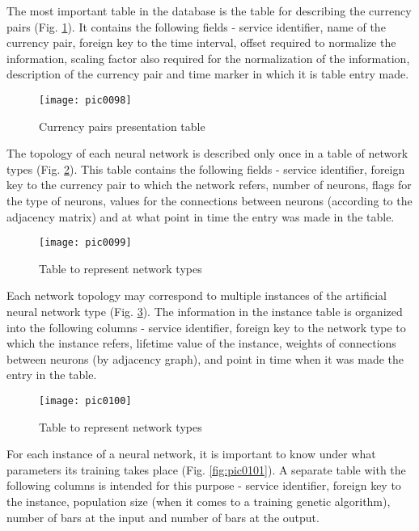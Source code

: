 The most important table in the database is the table for describing the currency pairs (Fig. \ref{fig:pic0098}). It contains the following fields - service identifier, name of the currency pair, foreign key to the time interval, offset required to normalize the information, scaling factor also required for the normalization of the information, description of the currency pair and time marker in which it is table entry made.

\begin{figure}[h]
\centering
\texttt{[image: pic0098]}
\caption{Currency pairs presentation table}
\label{fig:pic0098}
\end{figure}
\FloatBarrier

The topology of each neural network is described only once in a table of network types (Fig. \ref{fig:pic0099}). This table contains the following fields - service identifier, foreign key to the currency pair to which the network refers, number of neurons, flags for the type of neurons, values for the connections between neurons (according to the adjacency matrix) and at what point in time the entry was made in the table.

\begin{figure}[h]
\centering
\texttt{[image: pic0099]}
\caption{Table to represent network types}
\label{fig:pic0099}
\end{figure}
\FloatBarrier

Each network topology may correspond to multiple instances of the artificial neural network type (Fig. \ref{fig:pic0100}). The information in the instance table is organized into the following columns - service identifier, foreign key to the network type to which the instance refers, lifetime value of the instance, weights of connections between neurons (by adjacency graph), and point in time when it was made the entry in the table.

\begin{figure}[h]
\centering
\texttt{[image: pic0100]}
\caption{Table to represent network types}
\label{fig:pic0100}
\end{figure}
\FloatBarrier

For each instance of a neural network, it is important to know under what parameters its training takes place (Fig. \ref{fig:pic0101}). A separate table with the following columns is intended for this purpose - service identifier, foreign key to the instance, population size (when it comes to a training genetic algorithm), number of bars at the input and number of bars at the output.


